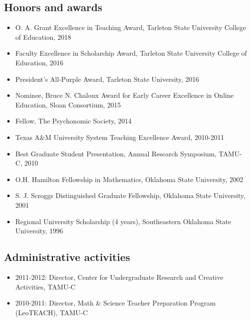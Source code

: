 \documentclass[article,10pt]{article}
\begin{document}
\subsection*{Honors and awards}
\label{sec:org8be592d}
\begin{itemize}
\item O. A. Grant Excellence in Teaching Award, Tarleton State University College of Education, 2018
\item Faculty Excellence in Scholarship Award, Tarleton State University College of Education, 2016
\item President's All-Purple Award, Tarleton State University, 2016
\item Nominee, Bruce N. Chaloux Award for Early Career Excellence in Online Education, Sloan Consortium, 2015
\item Fellow, The Psychonomic Society, 2014
\item Texas A\&M University System Teaching Excellence Award, 2010-2011
\item Best Graduate Student Presentation, Annual Research Symposium, TAMU-C, 2010
\item O.H. Hamilton Fellowship in Mathematics, Oklahoma State University, 2002
\item S. J. Scroggs Distinguished Graduate Fellowship, Oklahoma State University, 2001
\item Regional University Scholarship (4 years), Southeastern Oklahoma State University, 1996
\end{itemize}

\subsection*{Administrative activities}
\label{sec:org31c9500}
\begin{itemize}
\item 2011-2012: Director, Center for Undergraduate Research and Creative Activities, TAMU-C
\item 2010-2011: Director, Math \& Science Teacher Preparation Program (LeoTEACH), TAMU-C
\end{itemize}
\end{document}
